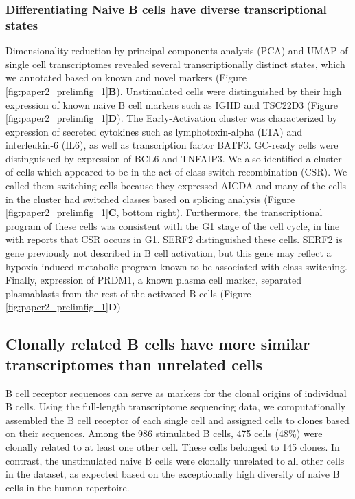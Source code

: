 \subsubsection{Differentiating Naive B cells have diverse transcriptional states}

Dimensionality reduction by principal components analysis (PCA) and UMAP\cite{mcinnes_umap_2018} of single cell transcriptomes revealed several transcriptionally distinct states, which we annotated based on known and novel markers  (Figure \ref{fig:paper2_prelimfig_1}\textbf{B}). Unstimulated cells were distinguished by their high expression of known naive B cell markers such as IGHD and TSC22D3 (Figure \ref{fig:paper2_prelimfig_1}\textbf{D}). The Early-Activation cluster was characterized by expression of secreted cytokines such as lymphotoxin-alpha (LTA) and interleukin-6 (IL6), as well as transcription factor BATF3. GC-ready cells were distinguished by expression of BCL6 and TNFAIP3. We also identified a cluster of cells which appeared to be in the act of class-switch recombination (CSR). We called them switching cells because they expressed AICDA and many of the cells in the cluster had switched classes based on splicing analysis (Figure \ref{fig:paper2_prelimfig_1}\textbf{C}, bottom right). Furthermore, the transcriptional program of these cells was consistent with the G1 stage of the cell cycle, in line with reports that CSR occurs in G1\cite{abbott2016germinal}. SERF2 distinguished these cells. SERF2 is gene previously not described in B cell activation, but this gene may reflect a hypoxia-induced metabolic program known to be associated with class-switching\cite{abbott2016germinal}. Finally, expression of PRDM1, a known plasma cell marker, separated plasmablasts from the rest of the activated B cells  (Figure \ref{fig:paper2_prelimfig_1}\textbf{D}) 


\subsection{Clonally related B cells have more similar transcriptomes than unrelated cells}
B cell receptor sequences can serve as markers for the clonal origins of individual B cells. Using the full-length transcriptome sequencing data, we computationally assembled the B cell receptor of each single cell and assigned cells to clones based on their sequences. Among the 986 stimulated B cells, 475 cells (48\%) were clonally related to at least one other cell. These cells belonged to 145 clones. In contrast, the unstimulated naive B cells were clonally unrelated to all other cells in the dataset, as expected based on the exceptionally high diversity of naive B cells in the human repertoire\cite{briney2019commonality}.

